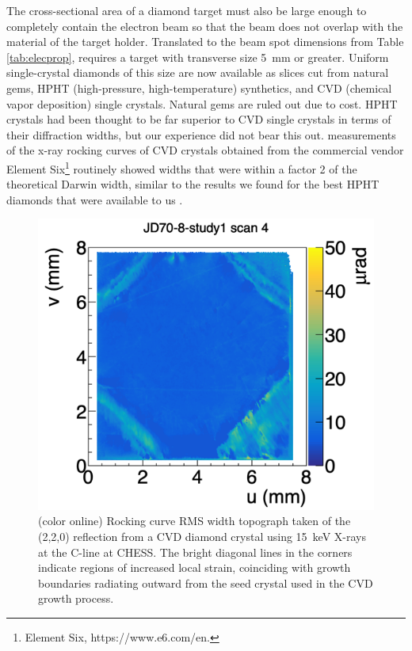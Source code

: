 The cross-sectional area of a diamond target must also be large enough to completely contain the electron beam so that the beam does not overlap with the material of the target holder. Translated to the beam spot dimensions from Table\,\ref{tab:elecprop}, \gx{}
requires a target with transverse size 5~mm or greater. Uniform single-crystal diamonds of
this size are now available as slices cut from natural gems, HPHT (high-pressure, 
high-temperature) synthetics, and CVD (chemical vapor deposition) single crystals. Natural gems are ruled out due to cost. HPHT crystals had been thought
to be far superior to CVD single crystals in terms of their diffraction widths, but our
experience did not bear this out. \GX{} measurements of the
x-ray rocking curves of CVD crystals obtained from the commercial vendor Element Six\footnote{Element Six, https://www.e6.com/en.} routinely
showed widths that were within a factor 2 of the theoretical Darwin width,
similar to the results we found for the best HPHT diamonds that were available to us
\cite{YANG2010719,YANG2012}.

\begin{figure}[tbp]
\begin{center}
 \includegraphics[clip=true,width=0.7\linewidth]{figures/JD70-8-study1_4_sigma.png}
\end{center}
\caption{(color online) Rocking curve RMS width topograph taken of the (2,2,0) reflection
from a CVD diamond crystal using 15~keV X-rays at the C-line at CHESS.
The bright diagonal lines in the corners
indicate regions of increased local strain, coinciding with growth boundaries radiating
outward from the seed crystal used in the CVD growth process. 
        }
\label{fig:diamond_rocking_curve_rms} 
\end{figure}

